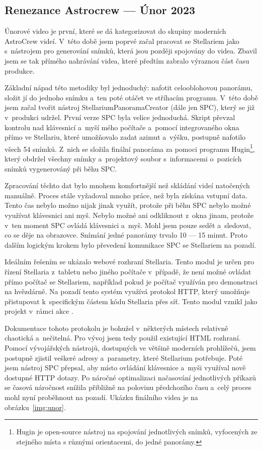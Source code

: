 \documentclass[12pt,a4paper,titlepage]{article}
\begin{document}
\subsection{Renezance Astrocrew --- Únor 2023}
Únorové video je první, které se dá kategorizovat do skupiny moderních AstroCrew videí. V~této době jsem poprvé začal pracovat se Stellariem jako s~nástrojem pro generování snímků, která jsou později spojovány do videa. Zbavil jsem se tak přímého nahrávání videa, které předtím zabralo výraznou část času produkce.

Základní nápad této metodiky byl jednoduchý: nafotit celooblohovou panorámu, složit jí do jednoho snímku a~ten poté otáčet ve stříhacím programu. V~této době jsem začal tvořit nástroj StellariumPanoramaCreator (dále jen SPC), který se již v~produkci udržel. První verze SPC byla velice jednoduchá. Skript převzal kontrolu nad klávesnicí a~myší mého počítače a~pomocí integrovaného okna přímo ve Stellariu, které umožňovalo zadat azimut a~výšku, postupně nafotilo všech 54 snímků. Z~nich se složila finální panoráma za pomoci programu Hugin\footnote{Hugin je open-source nástroj na spojování jednotlivých snímků, vyfocených ze stejného místa s různými orientacemi, do jedné panorámy. }, který obdržel všechny snímky a~projektový soubor s~informacemi o~pozicích snímků vygenerováný při běhu SPC.\@

Zpracování těchto dat bylo mnohem komfortnější než skládání videí natočených manuálně. Proces stále vyžadoval mnoho práce, než byla získána vstupní data. Tento čas nebylo možno nijak jinak využít, protože při běhu SPC nebylo možné využívat klávesnici ani myš. Nebylo možné ani odkliknout z~okna jinam, protože v~ten moment SPC ovládá klávesnici a~myš. Mohl jsem pouze sedět a~sledovat, co se děje na obrazovce. Snímání jedné panorámy trvalo 10 --- 15 minut. Proto dalším logickým krokem bylo převedení komunikace SPC se Stellariem na pozadí. 

Ideálním řešením se ukázalo webové rozhraní Stellaria. Tento modul je určen pro řízení Stellaria z~tabletu nebo jiného počítače v~případě, že není možné ovládat přímo počítač se Stellariem, například pokud je počítač využíván pro demonstraci na hvězdárně. Na pozadí tento systém využívá protokol HTTP, který umožňuje přistupovat k~specifickým částem kódu Stellaria přes síť. Tento modul vznikl jako projekt v~rámci akce . 

Dokumentace tohoto protokolu je bohužel v~některých místech relativně chaotická a~nečitelná. Pro vývoj jsem tedy použil existující HTML rozhraní. Pomocí vývojářských nástrojů, dostupných ve většině moderních prohlížečů, jsem postupně zjistil veškeré adresy a~parametry, které Stellarium potřebuje. Poté jsem nástroj SPC přepsal, aby místo ovládání klávesnice a~myši využíval nově dostupné HTTP dotazy. Po náročné optimalizaci načasování jednotlivých příkazů se časová náročnost snížila přibližně na polovinu předchozího času a~celý proces mohl nyní proběhnout na pozadí. Ukázku finálního videa je na obrázku~\ref{img:unor}.
\end{document}
